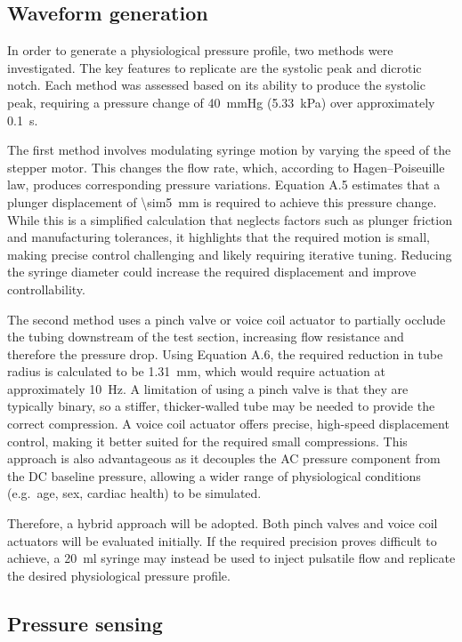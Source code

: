\documentclass[10pt, a4paper]{article}
\begin{document}
\subsection{Waveform generation}

In order to generate a physiological pressure profile, two methods were investigated. The key features to replicate are the systolic peak and dicrotic notch. Each method was assessed based on its ability to produce the systolic peak, requiring a pressure change of \qty{40}{\mmHg} (\qty{5.33}{\kilo\pascal}) over approximately \qty{0.1}{\second}.

The first method involves modulating syringe motion by varying the speed of the stepper motor. This changes the flow rate, which, according to Hagen--Poiseuille law, produces corresponding pressure variations. Equation A.5 estimates that a plunger displacement of \qty{\sim5}{\milli\metre} is required to achieve this pressure change. While this is a simplified calculation that neglects factors such as plunger friction and manufacturing tolerances, it highlights that the required motion is small, making precise control challenging and likely requiring iterative tuning. Reducing the syringe diameter could increase the required displacement and improve controllability.

The second method uses a pinch valve or voice coil actuator to partially occlude the tubing downstream of the test section, increasing flow resistance and therefore the pressure drop. Using Equation A.6, the required reduction in tube radius is calculated to be \qty{1.31}{\milli\metre}, which would require actuation at approximately \qty{10}{\hertz}. A limitation of using a pinch valve is that they are typically binary, so a stiffer, thicker-walled tube may be needed to provide the correct compression. A voice coil actuator offers precise, high-speed displacement control, making it better suited for the required small compressions. This approach is also advantageous as it decouples the AC pressure component from the DC baseline pressure, allowing a wider range of physiological conditions (e.g.\ age, sex, cardiac health) to be simulated.

Therefore, a hybrid approach will be adopted. Both pinch valves and voice coil actuators will be evaluated initially. If the required precision proves difficult to achieve, a \qty{20}{\milli\litre} syringe may instead be used to inject pulsatile flow and replicate the desired physiological pressure profile.

\subsection{Pressure sensing}
\end{document}
